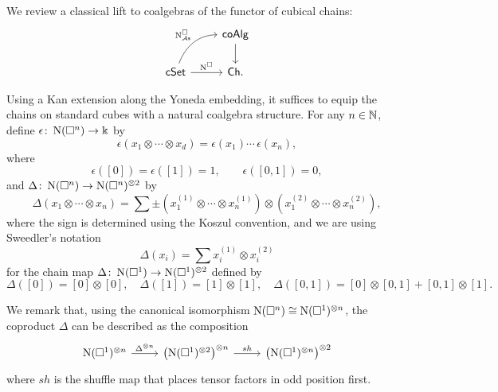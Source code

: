 We review a classical lift to coalgebras of the functor of cubical chains:
\begin{equation*}
\begin{tikzcd}
& \coAlg \arrow[d] \\
\cSet \arrow[r, "\cchains"] \arrow[ur, "\cchainsAS", out=70, in=180] & \Ch.
\end{tikzcd}
\end{equation*}

Using a Kan extension along the Yoneda embedding, it suffices to equip the chains on standard cubes with a natural coalgebra structure.
For any $n \in \mathbb{N}$, define $\epsilon \colon \operatorname{N}(\square^n) \to \Bbbk$ by
\begin{equation*}
\epsilon \left( x_1 \otimes \cdots \otimes x_d \right) = \epsilon(x_1) \cdots \, \epsilon(x_n),
\end{equation*}
where
\begin{equation*}
\epsilon([0]) = \epsilon([1]) = 1, \qquad \epsilon([0, 1]) = 0,
\end{equation*} 
and $\Delta \colon \operatorname{N}(\square^n) \to \operatorname{N}(\square^n)^{\otimes 2}$ by
\begin{equation*}	
\Delta (x_1 \otimes \cdots \otimes x_n) = 	
\sum \pm \left( x_1^{(1)} \otimes \cdots \otimes x_n^{(1)} \right) \otimes 	
\left( x_1^{(2)} \otimes \cdots \otimes x_n^{(2)} \right),	
\end{equation*}	
where the sign is determined using the Koszul convention, and we are using Sweedler's notation
\begin{equation*}	
\Delta(x_i) = \sum x_i^{(1)} \otimes x_i^{(2)}
\end{equation*}
for the chain map $\Delta \colon \operatorname{N}(\square^1) \to \operatorname{N}(\square^1)^{\otimes 2}$ defined by
\begin{equation*}
\Delta([0]) = [0] \otimes [0], \quad \Delta([1]) = [1] \otimes [1], \quad \Delta([0,1]) = [0] \otimes [0,1] + [0,1] \otimes [1].
\end{equation*}

We remark that, using the canonical isomorphism $\operatorname{N}(\square^n) \cong \operatorname{N}(\square^1)^{\otimes n}$, the coproduct $\Delta$ can be described as the composition
\begin{equation*}
\begin{tikzcd}
\chains(\square^1)^{\otimes n} \arrow[r, "\Delta^{\otimes n}"] & \left( \chains(\square^1)^{\otimes 2}  \right)^{\otimes n} \arrow[r, "sh"] & \left( \chains(\square^1)^{\otimes n} \right)^{\otimes 2}
\end{tikzcd}
\end{equation*}
where $sh$ is the shuffle map that places tensor factors in odd position first. \vspace*{5pt} \\

